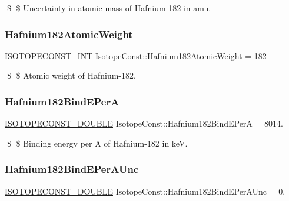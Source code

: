 \$ \$ Uncertainty in atomic mass of Hafnium-\/182 in amu. \mbox{\label{group___isotope_const-_hafnium-_hf182_ga13edc5ca48dd664ea524302e302d21d5}} 
\subsubsection{\texorpdfstring{Hafnium182\+Atomic\+Weight}{Hafnium182AtomicWeight}}
{\footnotesize\ttfamily \mbox{\hyperlink{group___isotope_const-_macros_ga5f18360b3e99483a35c32d789e62621c}{I\+S\+O\+T\+O\+P\+E\+C\+O\+N\+S\+T\+\_\+\+I\+NT}} Isotope\+Const\+::\+Hafnium182\+Atomic\+Weight = 182}

\$ \$ Atomic weight of Hafnium-\/182. \mbox{\label{group___isotope_const-_hafnium-_hf182_ga8dcd8535238c7a656537b57c3f24f878}} 
\subsubsection{\texorpdfstring{Hafnium182\+Bind\+E\+PerA}{Hafnium182BindEPerA}}
{\footnotesize\ttfamily \mbox{\hyperlink{group___isotope_const-_macros_ga8f45a7272ce02c0b4c65c44636ed719a}{I\+S\+O\+T\+O\+P\+E\+C\+O\+N\+S\+T\+\_\+\+D\+O\+U\+B\+LE}} Isotope\+Const\+::\+Hafnium182\+Bind\+E\+PerA = 8014.}

\$ \$ Binding energy per A of Hafnium-\/182 in keV. \mbox{\label{group___isotope_const-_hafnium-_hf182_ga1ba1ae605e4f9bd6d550957dbd2dba4c}} 
\subsubsection{\texorpdfstring{Hafnium182\+Bind\+E\+Per\+A\+Unc}{Hafnium182BindEPerAUnc}}
{\footnotesize\ttfamily \mbox{\hyperlink{group___isotope_const-_macros_ga8f45a7272ce02c0b4c65c44636ed719a}{I\+S\+O\+T\+O\+P\+E\+C\+O\+N\+S\+T\+\_\+\+D\+O\+U\+B\+LE}} Isotope\+Const\+::\+Hafnium182\+Bind\+E\+Per\+A\+Unc = 0.}

